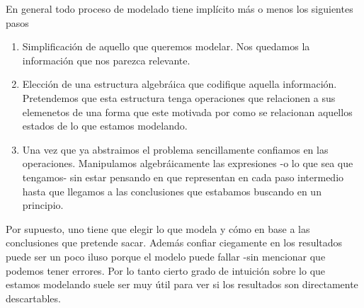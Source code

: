En general todo proceso de modelado tiene implícito más o menos los siguientes pasos
\begin{enumerate}
    \item Simplificación de aquello que queremos modelar. Nos quedamos la información que nos parezca relevante.
    \item Elección de una estructura algebráica que codifique aquella información. Pretendemos que esta estructura tenga operaciones que relacionen a sus elemenetos de una forma que este motivada por como se relacionan aquellos estados de lo que estamos modelando.
    \item Una vez que ya abstraimos el problema sencillamente confiamos en las operaciones. Manipulamos algebráicamente las expresiones -o lo que sea que tengamos- sin estar pensando en que representan en cada paso intermedio hasta que llegamos a las conclusiones que estabamos buscando en un principio.
\end{enumerate}
Por supuesto, uno tiene que elegir lo que modela y cómo en base a las conclusiones que pretende sacar. Además confiar ciegamente en los resultados puede ser un poco iluso porque el modelo puede fallar -sin mencionar que podemos tener errores. Por lo tanto cierto grado de intuición sobre lo que estamos modelando suele ser muy útil para ver si los resultados son directamente descartables.

